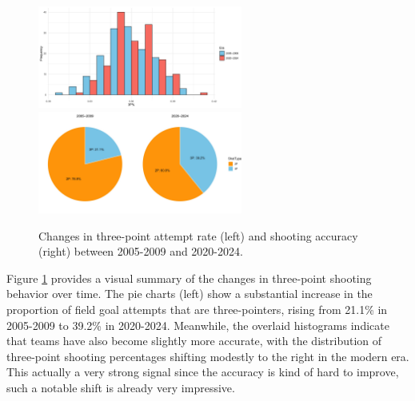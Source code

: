 \documentclass[11pt, a4paper]{article} %
\begin{document}
\begin{figure}[htbp]
    \centering
    \includegraphics[width=0.6\textwidth]{figure/3 point shooting percentage.jpg}
    \includegraphics[width=0.6\textwidth]{figure/3 point attempt rate.jpg}
    \caption{Changes in three-point attempt rate (left) and shooting accuracy (right) between 2005-2009 and 2020-2024.}
    \label{fig:1}
\end{figure}



Figure \ref{fig:1} provides a visual summary of the changes in three-point shooting behavior over time. The pie charts (left) show a 
substantial increase in the proportion of field goal attempts that are three-pointers, rising from 21.1\% in 2005-2009 to 39.2\% 
in 2020-2024. Meanwhile, the overlaid histograms indicate that teams have also become slightly more accurate, 
with the distribution of three-point shooting percentages shifting modestly to the right in the modern era. This actually a very strong 
signal since the accuracy is kind of hard to improve, such a notable shift is already very impressive.
\end{document}
